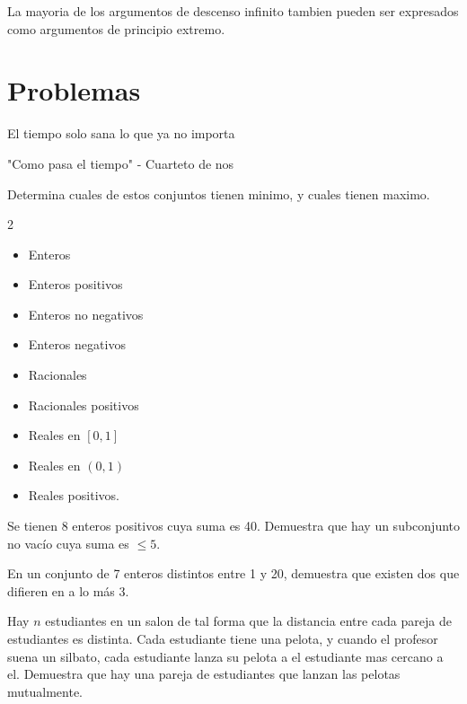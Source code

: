 \documentclass[11pt]{scrartcl}
\newcommand{\thmdifficulty}{0}
\newcommand{\problemdiff}[1]{\renewcommand{\thmdifficulty}{#1}}
\begin{document}
\begin{remark*}
    La mayoria de los argumentos de descenso infinito tambien pueden ser expresados como argumentos de principio extremo.
\end{remark*}

\newpage
\section{Problemas}
\epigraph{El tiempo solo sana lo que ya no importa}{"Como pasa el tiempo" - Cuarteto de nos}

\problemdiff{1}
\begin{problema}
    Determina cuales de estos conjuntos tienen minimo, y cuales tienen maximo. 
    \begin{multicols}{2}
    \begin{itemize}
        \item Enteros 
        \item Enteros positivos 
        \item Enteros no negativos 
        \item Enteros negativos 
        \item Racionales  
        \item Racionales positivos 
        \item Reales en $[0,1]$
        \item Reales en $(0,1)$
        \item Reales positivos. 
    \end{itemize}
    \end{multicols}
\end{problema}

\problemdiff{1}
\begin{problema}
    Se tienen 8 enteros positivos cuya suma es 40. Demuestra que hay un subconjunto no vacío cuya suma es $\leq 5$.
\end{problema}

\problemdiff{2}
\begin{problema}
    En un conjunto de 7 enteros distintos entre 1 y 20, demuestra que existen dos que difieren en a lo más 3.
\end{problema}

\problemdiff{2}
\begin{problema}
    Hay $n$ estudiantes en un salon de tal forma que la distancia entre cada pareja de estudiantes es distinta. Cada estudiante tiene una pelota, y cuando el profesor suena un silbato, cada estudiante lanza su pelota a el estudiante mas cercano a el. Demuestra que hay una pareja de estudiantes que lanzan las pelotas mutualmente.
\end{problema}
\end{document}
